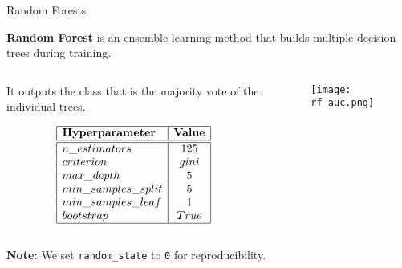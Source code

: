 \begin{frame}{Random Forests}

    \textbf{Random Forest} is an ensemble learning method that builds multiple decision trees during training. 

    \begin{columns}
        \begin{column}{0.45\textwidth}
            It outputs the class that is the majority vote of the individual trees.

            \vspace{-0.5em}

            {\small
            $$
            \begin{array}{|l|c|}
                \hline
                \textbf{Hyperparameter} & \textbf{Value} \\
                \hline
                \hline
                n\_estimators & 125 \\
                criterion & gini \\
                max\_depth & 5 \\
                min\_samples\_split & 5 \\
                min\_samples\_leaf & 1 \\
                bootstrap & True \\
                \hline
            \end{array}
            $$
            }
        \end{column}
        \begin{column}{0.55\textwidth}
            \begin{figure}
                \centering
                \vfill
                \texttt{[image: rf\_auc.png]}
            \end{figure}
        \end{column}
    \end{columns}

        \begin{footnotesize}
            \centering
            \textbf{Note:} We set \texttt{random\_state} to \texttt{0} for reproducibility.
        \end{footnotesize}
\end{frame}

